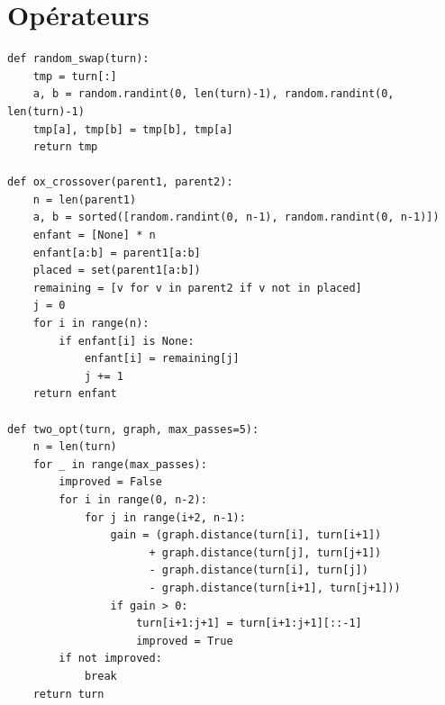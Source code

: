 \documentclass[12pt,a4paper]{report}
\begin{document}
\section{Opérateurs}
\begin{lstlisting}
def random_swap(turn):
    tmp = turn[:]
    a, b = random.randint(0, len(turn)-1), random.randint(0, len(turn)-1)
    tmp[a], tmp[b] = tmp[b], tmp[a]
    return tmp

def ox_crossover(parent1, parent2):
    n = len(parent1)
    a, b = sorted([random.randint(0, n-1), random.randint(0, n-1)])
    enfant = [None] * n
    enfant[a:b] = parent1[a:b]
    placed = set(parent1[a:b])
    remaining = [v for v in parent2 if v not in placed]
    j = 0
    for i in range(n):
        if enfant[i] is None:
            enfant[i] = remaining[j]
            j += 1
    return enfant

def two_opt(turn, graph, max_passes=5):
    n = len(turn)
    for _ in range(max_passes):
        improved = False
        for i in range(0, n-2):
            for j in range(i+2, n-1):
                gain = (graph.distance(turn[i], turn[i+1])
                      + graph.distance(turn[j], turn[j+1])
                      - graph.distance(turn[i], turn[j])
                      - graph.distance(turn[i+1], turn[j+1]))
                if gain > 0:
                    turn[i+1:j+1] = turn[i+1:j+1][::-1]
                    improved = True
        if not improved:
            break
    return turn
\end{lstlisting}
\end{document}
